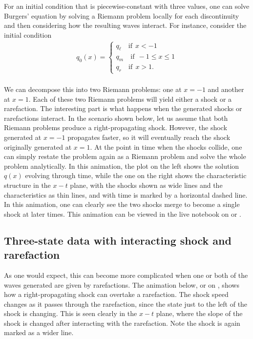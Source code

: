 \documentclass{SIAMbook2016}
\begin{document}
For an initial condition that is piecewise-constant with three values,
one can solve Burgers' equation by solving a Riemann problem locally for
each discontinuity and then considering how the resulting waves
interact. For instance, consider the initial condition \begin{align*}
q_0(x) = 
\begin{cases}
q_\ell \quad \text{if} \ \ x < -1 \\
q_m \quad \text{if} \ \ -1\le x \le 1 \\
q_r \quad \text{if} \ \ x > 1.
\end{cases}
\end{align*}\\
We can decompose this into two Riemann problems: one at \(x=-1\) and
another at \(x=1\). Each of these two Riemann problems will yield either
a shock or a rarefaction. The interesting part is what happens when the
generated shocks or rarefactions interact. In the scenario shown below,
let us assume that both Riemann problems produce a right-propagating
shock. However, the shock generated at \(x=-1\) propagates faster, so it
will eventually reach the shock originally generated at \(x=1\). At the
point in time when the shocks collide, one can simply restate the
problem again as a Riemann problem and solve the whole problem
analytically. In this animation, the plot on the left shows the solution
\(q(x)\) evolving through time, while the one on the right shows the
characteristic structure in the \(x-t\) plane, with the shocks shown as
wide lines and the characteristics as thin lines, and with time is
marked by a horizontal dashed line. In this animation, one can clearly
see the two shocks merge to become a single shock at later times. This
animation can be viewed in the live notebook on or
.

\hypertarget{three-state-data-with-interacting-shock-and-rarefaction}{%
\subsection{Three-state data with interacting shock and
rarefaction}\label{three-state-data-with-interacting-shock-and-rarefaction}}

As one would expect, this can become more complicated when one or both
of the waves generated are given by rarefactions. The animation below,
or on
, shows how a right-propagating shock can overtake a
rarefaction. The shock speed changes as it passes through the
rarefaction, since the state just to the left of the shock is changing.
This is seen clearly in the \(x-t\) plane, where the slope of the shock
is changed after interacting with the rarefaction. Note the shock is
again marked as a wider line.
\end{document}
